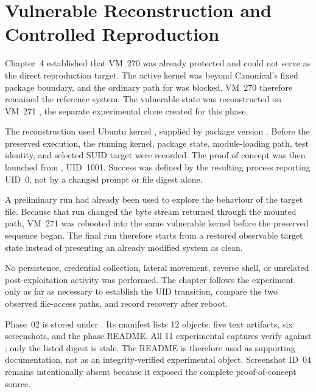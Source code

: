 \section{Vulnerable Reconstruction and Controlled Reproduction}
\label{sec:controlled-reproduction}

\graphicspath{{../evidence/}{evidence/}}

Chapter~4 established that VM~270 was already protected and could not serve as
the direct reproduction target. The active kernel was beyond Canonical's fixed
package boundary, and the ordinary  path for
 was blocked. VM~270 therefore remained the reference
system. The vulnerable state was reconstructed on VM~271
, the separate experimental clone created for this phase.

The reconstruction used Ubuntu kernel , supplied by
package version . Before the preserved execution, the
running kernel, package state, module-loading path, test identity, and selected
SUID target were recorded. The proof of concept was then launched from
, UID~1001. Success was defined by the resulting process
reporting UID~0, not by a changed prompt or file digest alone.

A preliminary run had already been used to explore the behaviour of the target
file. Because that run changed the byte stream returned through the mounted
path, VM~271 was rebooted into the same vulnerable kernel before the preserved
sequence began. The final run therefore starts from a restored observable
target state instead of presenting an already modified system as clean.

No persistence, credential collection, lateral movement, reverse shell, or
unrelated post-exploitation activity was performed. The chapter follows the
experiment only as far as necessary to establish the UID transition, compare
the two observed file-access paths, and record recovery after reboot.

\begin{evidencebox}
Phase~02 is stored under . Its manifest lists
12 objects: five text artifacts, six screenshots, and the phase README. All 11
experimental captures verify against ; only the listed
 digest is stale. The README is therefore used as supporting
documentation, not as an integrity-verified experimental object. Screenshot
ID~04 remains intentionally absent because it exposed the complete
proof-of-concept source.
\end{evidencebox}

